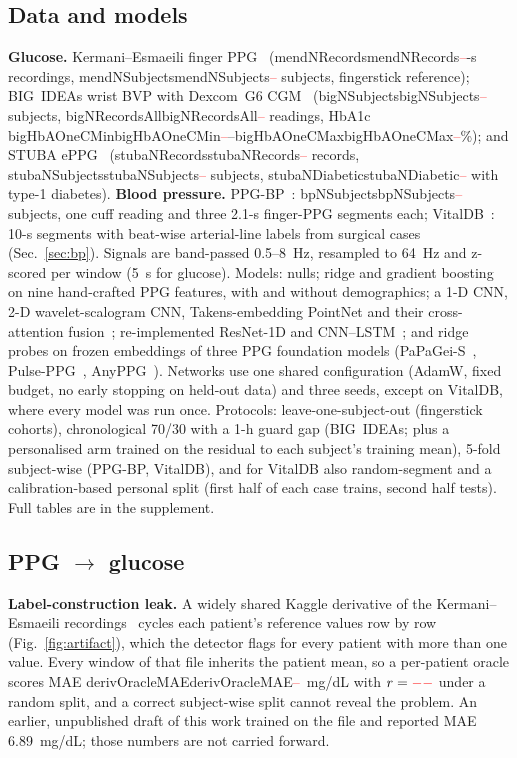 \documentclass[journal]{IEEEtran}
\newcommand{\m}[1]{\ifcsname #1\endcsname\csname #1\endcsname\else\textcolor{red}{--}\fi}
\begin{document}
\subsection{Data and models}
\textbf{Glucose.}  Kermani--Esmaeili finger PPG~\cite{kermani2023data}
(\m{mendNRecords} 10-s recordings, \m{mendNSubjects} subjects, fingerstick
reference); BIG~IDEAs wrist BVP with Dexcom~G6 CGM~\cite{cho2026bigideas,bent2021}
(\m{bigNSubjects} subjects, \m{bigNRecordsAll} readings, HbA1c
\m{bigHbAOneCMin}--\m{bigHbAOneCMax}\%); and STUBA ePPG~\cite{stuba2026}
(\m{stubaNRecords} records, \m{stubaNSubjects} subjects, \m{stubaNDiabetic} with
type-1 diabetes).  \textbf{Blood pressure.}  PPG-BP~\cite{liang2018ppgbp}:
\m{bpNSubjects} subjects, one cuff reading and three 2.1-s finger-PPG
segments each; VitalDB~\cite{lee2022vitaldb}: 10-s segments with
beat-wise arterial-line labels from surgical cases (Sec.~\ref{sec:bp}).
Signals are band-passed 0.5--8~Hz, resampled to 64~Hz and
z-scored per window (5~s for glucose).  Models: nulls; ridge and gradient
boosting on nine hand-crafted PPG features, with and without demographics;
a 1-D CNN, 2-D wavelet-scalogram CNN, Takens-embedding PointNet and their
cross-attention fusion~\cite{takens1981,qi2017pointnet,vaswani2017attention};
re-implemented ResNet-1D and CNN--LSTM~\cite{zeynali2025,syamsul2026}; and
ridge probes on frozen embeddings of three PPG foundation models
(PaPaGei-S~\cite{papagei2025}, Pulse-PPG~\cite{pulseppg2025},
AnyPPG~\cite{anyppg2026}).  Networks use one shared configuration (AdamW,
fixed budget, no early stopping on held-out data) and three seeds, except on
VitalDB, where every model was run once.
Protocols: leave-one-subject-out (fingerstick cohorts), chronological 70/30
with a 1-h guard gap (BIG~IDEAs; plus a personalised arm trained on the
residual to each subject's training mean), 5-fold subject-wise (PPG-BP,
VitalDB), and for VitalDB also random-segment and a calibration-based
personal split (first half of each case trains, second half tests).
Full tables are in the supplement.

\subsection{PPG $\to$ glucose}
\label{sec:glucose}
\textbf{Label-construction leak.}  A widely shared Kaggle derivative of the
Kermani--Esmaeili recordings~\cite{kaggle_ppg} cycles each patient's
reference values row by row (Fig.~\ref{fig:artifact}), which the detector
flags for every patient with more than one value.  Every window of that file
inherits the patient mean, so a per-patient oracle scores MAE
\m{derivOracleMAE}~mg/dL with $r=\m{derivOracleR}$ under a random split,
and a correct subject-wise split cannot reveal the problem.  An earlier,
unpublished draft of this work trained on the file and reported MAE
6.89~mg/dL; those numbers are not carried forward.
\end{document}
